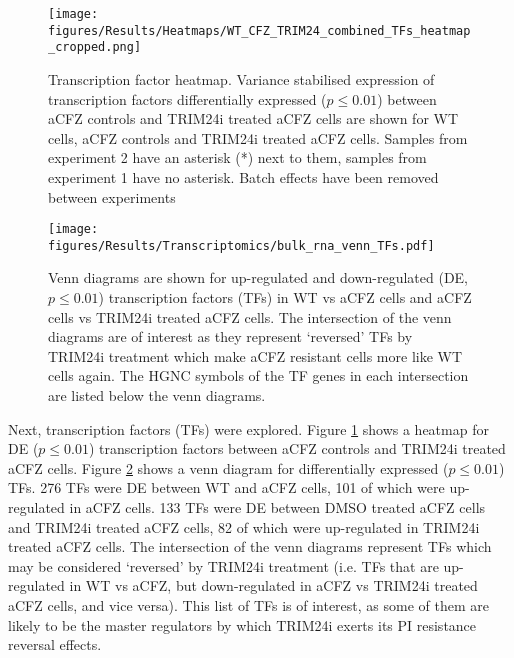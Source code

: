 
\begin{figure}[p]
\centering
\texttt{[image: figures/Results/Heatmaps/WT\_CFZ\_TRIM24\_combined\_TFs\_heatmap\_cropped.png]}
\caption[Transcription factor heatmap]{Transcription factor heatmap.
Variance stabilised expression of transcription factors differentially expressed ($p \leq 0.01$) between aCFZ controls and TRIM24i treated aCFZ cells are shown for WT cells, aCFZ controls and TRIM24i treated aCFZ cells.
Samples from experiment 2 have an asterisk (*) next to them, samples from experiment 1 have no asterisk.
Batch effects have been removed between experiments}
\label{fig:bulk_tf_heatmap}
\end{figure}

\begin{figure}[htb]
\centering
\texttt{[image: figures/Results/Transcriptomics/bulk\_rna\_venn\_TFs.pdf]}
\caption[Transcription factor venn diagrams: WT vs aCFZ and aCFZ vs aCFZ TRIM24i]{Venn diagrams are shown for up-regulated and down-regulated (DE, $p\leq0.01$) transcription factors (TFs) in WT vs aCFZ cells and aCFZ cells vs TRIM24i treated aCFZ cells.
The intersection of the venn diagrams are of interest as they represent `reversed' TFs by TRIM24i treatment which make aCFZ resistant cells more like WT cells again.
The HGNC symbols of the TF genes in each intersection are listed below the venn diagrams.}
\label{fig:bulk_tf_venn}
\end{figure}

Next, transcription factors (TFs) were explored.
Figure \ref{fig:bulk_tf_heatmap} shows a heatmap for DE ($p\leq0.01$) transcription factors between aCFZ controls and TRIM24i treated aCFZ cells.
Figure \ref{fig:bulk_tf_venn} shows a venn diagram for differentially expressed ($p\leq0.01$) TFs.
276 TFs were DE between WT and aCFZ cells, 101 of which were up-regulated in aCFZ cells.
133 TFs were DE between DMSO treated aCFZ cells and TRIM24i treated aCFZ cells, 82 of which were up-regulated in TRIM24i treated aCFZ cells.
The intersection of the venn diagrams represent TFs which may be considered `reversed' by TRIM24i treatment (i.e. TFs that are up-regulated in WT vs aCFZ, but down-regulated in aCFZ vs TRIM24i treated aCFZ cells, and vice versa).
This list of TFs is of interest, as some of them are likely to be the master regulators by which TRIM24i exerts its PI resistance reversal effects.

